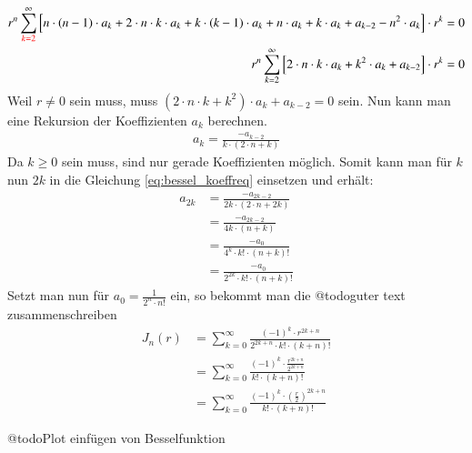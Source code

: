 \begin{refsection}
\begin{align*}
	r^n
	\sum_{\textcolor{red}{k=2}}^{\infty}
	\left[ n \cdot \left( n - 1 \right) \cdot a_k
	+
	2 \cdot n \cdot k \cdot a_k
	+
	k \cdot \left( k - 1 \right) \cdot a_k
	+
	n \cdot a_k
	+
	k \cdot a_k
	+
	a_{k-2}
	-
	n^2 \cdot a_k
	\right]
	\cdot r^k
	= 0 \\
	r^n
	\sum_{k=2}^{\infty}
	\left[
	2 \cdot n \cdot k \cdot a_k
	+
	k^2 \cdot a_k
	+
	a_{k - 2}
	\right]
	\cdot r^k
	= 0
\end{align*}
Weil $r \neq 0$ sein muss, muss $ \left( 2 \cdot n \cdot k + k^2 \right) \cdot a_k + a_{k - 2} = 0$ sein.
Nun kann man eine Rekursion der Koeffizienten $a_k$ berechnen.
\begin{align}
	a_k
	=
	\frac
	{
		-a_{k - 2}
	}{
		k \cdot \left( 2 \cdot n + k \right)	
	}
	\label{eq:bessel_koeffreq}
\end{align}
Da $k \geq 0$ sein muss, sind nur gerade Koeffizienten m\"oglich. Somit kann man f\"ur $k$ nun $2k$ in die Gleichung \ref{eq:bessel_koeffreq} einsetzen und erh\"alt:
\begin{align*}
	a_{2k}
	&=
	\frac
	{
		-a_{2k - 2}
	}{
		2k \cdot \left( 2 \cdot n + 2k \right)	
	} \\
	&=
	\frac
	{
		-a_{2k - 2}
	}{
		4k \cdot \left( n + k \right)	
	} \\
	&=
	\frac
	{
		-a_0
	}{
		4^k \cdot {k}! \cdot {\left( n + k \right)}!
	} \\
	&=
	\frac
	{
		-a_0
	}{
		2^{2k} \cdot {k}! \cdot {\left( n + k \right)}!
	}
\end{align*}
Setzt man nun f\"ur $a_0 = \frac{1}{2^n \cdot {n}!}$ ein, so bekommt man die @todo{guter text zusammenschreiben}
\begin{align}
	J_n \left( r \right)
	&= \nonumber
	\sum_{k=0} ^{\infty}
	\frac
	{
		\left( - 1 \right) ^k \cdot r ^{2k+n}
	}{
		2^{2k+n} \cdot {k}! \cdot { \left( k + n \right) }!
	} \\
	&=
	\sum_{k=0} ^{\infty}
	\frac
	{
		\left( - 1 \right) ^k \cdot 
		\frac
		{
			r ^{2k+n}
		}{
			2^{2k+n}
		}
	}{
		{k}! \cdot { \left( k + n \right) }!
	} \\
	&=
	\sum_{k=0} ^{\infty}
	\frac
	{
		\left( - 1 \right) ^k \cdot 
		\left(		
		\frac
		{
			r
		}{
			2
		} \right) ^{2k+n}
	}{
		{k}! \cdot { \left( k + n \right) }!
	}
	\label{eq:bessel_summenformel}
\end{align}

@todo{Plot einf\"ugen von Besselfunktion}

\printbibliography[heading=subbibliography]
\end{refsection}


